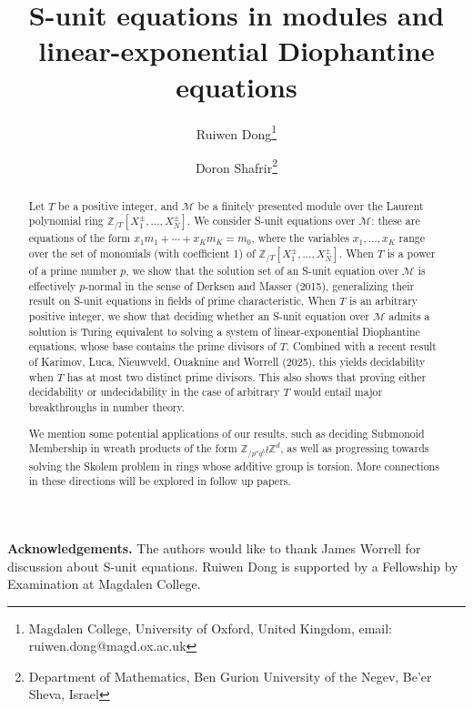 \documentclass[letterpaper, 11pt, thm-restate]{article}
\numberwithin{equation}{section}
\theoremstyle{definition}
\theoremstyle{definition}
\theoremstyle{definition}
\begin{document}
\title{S-unit equations in modules and linear-exponential Diophantine equations}
\author{Ruiwen Dong\footnote{Magdalen College, University of Oxford, United Kingdom, email: ruiwen.dong@magd.ox.ac.uk} \and Doron Shafrir\footnote{Department of Mathematics, Ben Gurion University of the Negev, Be’er Sheva, Israel}}
\date{}

\maketitle
\thispagestyle{empty}

\begin{abstract}
    Let $T$ be a positive integer, and $\mathcal{M}$ be a finitely presented module over the Laurent polynomial ring $\mathbb{Z}_{/T}[X_1^{\pm}, \ldots, X_N^{\pm}]$.
    We consider S-unit equations over $\mathcal{M}$: these are equations of the form $x_1 m_1 + \cdots + x_K m_K = m_0$, where the variables $x_1, \ldots, x_K$ range over the set of monomials (with coefficient 1) of $\mathbb{Z}_{/T}[X_1^{\pm}, \ldots, X_N^{\pm}]$.
    When $T$ is a power of a prime number $p$, we show that the solution set of an S-unit equation over $\mathcal{M}$ is effectively $p$-normal in the sense of Derksen and Masser (2015), generalizing their result on S-unit equations in fields of prime characteristic.
    When $T$ is an arbitrary positive integer, we show that deciding whether an S-unit equation over $\mathcal{M}$ admits a solution is Turing equivalent to solving a system of linear-exponential Diophantine equations, whose base contains the prime divisors of $T$.
    Combined with a recent result of Karimov, Luca, Nieuwveld, Ouaknine and Worrell (2025), this yields decidability when $T$ has at most two distinct prime divisors.
    This also shows that proving either decidability or undecidability in the case of arbitrary $T$ would entail major breakthroughs in number theory.
    
    We mention some potential applications of our results, such as deciding Submonoid Membership in wreath products of the form $\mathbb{Z}_{/p^a q^b} \wr \mathbb{Z}^d$, as well as progressing towards solving the Skolem problem in rings whose additive group is torsion.
    More connections in these directions will be explored in follow up papers.
\end{abstract}

\vspace{0.5cm}
\noindent
\textbf{Acknowledgements.} The authors would like to thank James Worrell for discussion about S-unit equations. Ruiwen Dong is supported by a Fellowship by Examination at Magdalen College.
\end{document}
